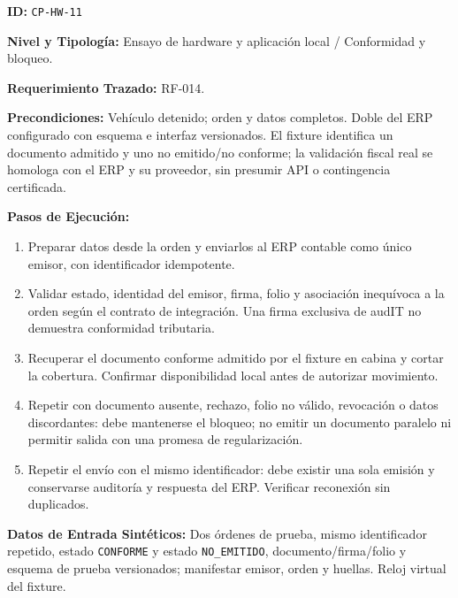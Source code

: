 \par\noindent\textbf{ID:} \texttt{C\allowbreak{}P\allowbreak{}-\allowbreak{}H\allowbreak{}W\allowbreak{}-\allowbreak{}1\allowbreak{}1\allowbreak{}}\par
\par\noindent\textbf{Nivel y Tipología:} Ensayo de hardware y aplicación local / Conformidad y bloqueo.\par
\par\noindent\textbf{Requerimiento Trazado:} RF-014.\par
\par\noindent\textbf{Precondiciones:} Vehículo detenido; orden y datos completos. Doble del ERP configurado con esquema e interfaz versionados. El fixture identifica un documento admitido y uno no emitido/no conforme; la validación fiscal real se homologa con el ERP y su proveedor, sin presumir API o contingencia certificada.\par
\par\noindent\textbf{Pasos de Ejecución:} \par
\begin{enumerate}
\item Preparar datos desde la orden y enviarlos al ERP contable como único emisor, con identificador idempotente.
\item Validar estado, identidad del emisor, firma, folio y asociación inequívoca a la orden según el contrato de integración. Una firma exclusiva de audIT no demuestra conformidad tributaria.
\item Recuperar el documento conforme admitido por el fixture en cabina y cortar la cobertura. Confirmar disponibilidad local antes de autorizar movimiento.
\item Repetir con documento ausente, rechazo, folio no válido, revocación o datos discordantes: debe mantenerse el bloqueo; no emitir un documento paralelo ni permitir salida con una promesa de regularización.
\item Repetir el envío con el mismo identificador: debe existir una sola emisión y conservarse auditoría y respuesta del ERP. Verificar reconexión sin duplicados.
\end{enumerate}
\par\noindent\textbf{Datos de Entrada Sintéticos:} Dos órdenes de prueba, mismo identificador repetido, estado \texttt{C\allowbreak{}O\allowbreak{}N\allowbreak{}F\allowbreak{}O\allowbreak{}R\allowbreak{}M\allowbreak{}E\allowbreak{}} y estado \texttt{N\allowbreak{}O\allowbreak{}\_\allowbreak{}E\allowbreak{}M\allowbreak{}I\allowbreak{}T\allowbreak{}I\allowbreak{}D\allowbreak{}O\allowbreak{}}, documento/firma/folio y esquema de prueba versionados; manifestar emisor, orden y huellas. Reloj virtual del fixture.\par
